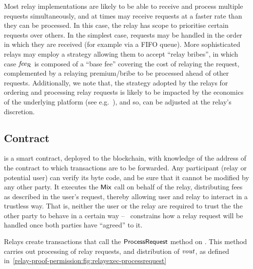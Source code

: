\medskip

\begin{notebox}
Most relay implementations are likely to be able to receive and process multiple requests simultaneously, and at times may receive requests at a faster rate than they can be processed.  In this case, the relay has scope to prioritise certain requests over others.  In the simplest case, requests may be handled in the order in which they are received (for example via a FIFO queue). More sophisticated relays may employ a strategy allowing them to accept ``relay bribes'', in which case $\mathit{fee_{\mathcal{R}}}$ is composed of a ``base fee'' covering the cost of relaying the request, complemented by a relaying premium/bribe to be processed ahead of other requests.
    Additionally, we note that, the strategy adopted by the relays for ordering and processing relay requests is likely to be impacted by the economics of the underlying platform (see e.g.~\cite{eip-1559,eip-1559-analysis}), and so, can be adjusted at the relay's discretion.
\end{notebox}

\subsection{\relayexec Contract}\label{relay-proof-permission:protocol:relayexec}

\relayexec{} is a smart contract, deployed to the blockchain, with knowledge of the address of the \mixer{} contract to which transactions are to be forwarded. Any participant (relay or potential user) can verify its byte code, and be sure that it cannot be modified by any other party. It executes the $\mathsf{Mix}$ call on behalf of the relay, distributing fees as described in the user's request, thereby allowing user and relay to interact in a trustless way. That is, neither the user or the relay are required to trust the the other party to behave in a certain way -- \relayexec~constrains how a relay request will be handled once both parties have ``agreed'' to it.

Relays create transactions that call the $\mathsf{ProcessRequest}$ method on \relayexec{}. This method carries out processing of relay requests, and distribution of $\mathit{vout}$, as defined in~\cref{relay-proof-permission:fig:relayexec-processrequest}

